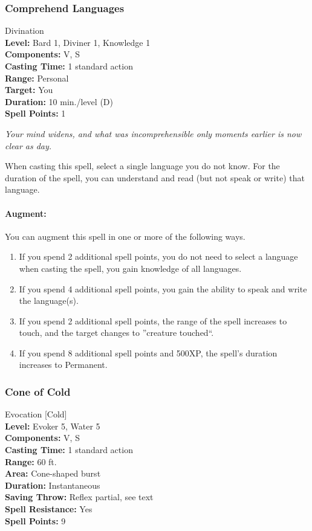 \subsubsection{Comprehend Languages}
\label{Spell:ComprehendLanguages}
Divination
\\ \textbf{Level:} Bard 1, Diviner 1, Knowledge 1
\\ \textbf{Components:} V, S
\\ \textbf{Casting Time:} 1 standard action
\\ \textbf{Range:} Personal
\\ \textbf{Target:} You
\\ \textbf{Duration:} 10 min./level (D)
\\ \textbf{Spell Points:} 1

\emph{Your mind widens, and what was incomprehensible only moments earlier is now clear as day.}

When casting this spell, select a single language you do not know. For the duration of the spell, you can understand and read (but not speak or write) that language.


\paragraph{Augment:} You can augment this spell in one or more of the following ways.
\begin{enumerate}
 \item If you spend 2 additional spell points, you do not need to select a language when casting the spell, you gain knowledge of all languages.
 \item If you spend 4 additional spell points, you gain the ability to speak and write the language(s).
 \item If you spend 2 additional spell points, the range of the spell increases to touch, and the target changes to ''creature touched``.
 \item If you spend 8 additional spell points and 500XP, the spell's duration increases to Permanent.
\end{enumerate}
\subsubsection{Cone of Cold} 
\label{Spell:ConeOfCold}
Evocation [Cold]
\\ \textbf{Level:} Evoker 5, Water 5
\\ \textbf{Components:} V, S
\\ \textbf{Casting Time:} 1 standard action
\\ \textbf{Range:} 60 ft.
\\ \textbf{Area:} Cone-shaped burst
\\ \textbf{Duration:} Instantaneous
\\ \textbf{Saving Throw:} Reflex partial, see text
\\ \textbf{Spell Resistance:} Yes
\\ \textbf{Spell Points:} 9

